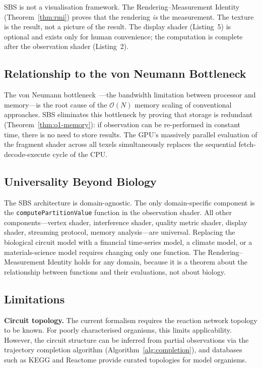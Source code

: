 \documentclass[11pt,twocolumn,a4paper]{article}
\newcommand{\BigO}{\mathcal{O}}
\begin{document}
SBS is not a visualisation framework.  The Rendering--Measurement
Identity (Theorem~\ref{thm:rmi}) proves that the rendering \emph{is}
the measurement.  The texture is the result, not a picture of the
result.  The display shader (Listing~5) is optional and exists only
for human convenience; the computation is complete after the
observation shader (Listing~2).

\subsection{Relationship to the von Neumann Bottleneck}

The von Neumann bottleneck~\citep{backus1978}---the bandwidth
limitation between processor and memory---is the root cause of the
$\BigO(N)$ memory scaling of conventional approaches.  SBS eliminates
this bottleneck by proving that storage is redundant
(Theorem~\ref{thm:o1-memory}): if observation can be re-performed in
constant time, there is no need to store results.  The GPU's
massively parallel evaluation of the fragment shader across all texels
simultaneously replaces the sequential fetch-decode-execute cycle of
the CPU.

\subsection{Universality Beyond Biology}

The SBS architecture is domain-agnostic.  The only domain-specific
component is the \texttt{computePartitionValue} function in the
observation shader.  All other components---vertex shader, interference
shader, quality metric shader, display shader, streaming protocol,
memory analysis---are universal.  Replacing the biological circuit
model with a financial time-series model, a climate model, or a
materials-science model requires changing only one function.  The
Rendering--Measurement Identity holds for any domain, because it is a
theorem about the relationship between functions and their
evaluations, not about biology.

\subsection{Limitations}

\textbf{Circuit topology.}  The current formalism requires the
reaction network topology to be known.  For poorly characterised
organisms, this limits applicability.  However, the circuit structure
can be inferred from partial observations via the trajectory completion
algorithm (Algorithm~\ref{alg:completion}), and databases such as
KEGG and Reactome provide curated topologies for model organisms.
\end{document}
